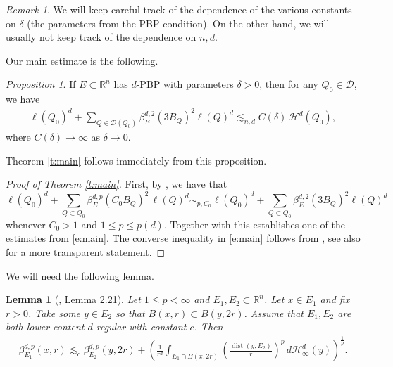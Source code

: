 \documentclass[11pt,reqno]{amsart}
\def\dist{\mathop\mathrm{dist}} 						%
\newtheorem{lemma}[theorem]{Lemma}
\theoremstyle{definition}
\theoremstyle{remark}
\newtheorem{remark}[theorem]{Remark}
\numberwithin{equation}{section}
\newcommand{\R}{\mathbb{R}}
\newcommand{\hd}{\mathcal{H}^d}
\newcommand{\hdc}{\mathcal{H}^d_\infty}
\newcommand{\dD}{\mathcal{D}}
\theoremstyle{theorem}
\newtheorem{propo}[theorem]{Proposition}
\theoremstyle{definition}
\theoremstyle{remark}
\numberwithin{equation}{section}
\begin{document}
 
	\begin{remark}
		We will keep careful track of the dependence of the various constants on $\delta$ (the parameters from the PBP condition). On the other hand, we will usually not keep track of the dependence on $n,d$.
	\end{remark}
	Our main estimate is the following.
	\begin{propo}\label{l:main-lemma}
		If $E \subset \R^n$ has $d$-PBP with parameters $\delta>0$, then for any $Q_0 \in \dD$, we have
		\begin{align}\label{eq:atst}
		\ell(Q_0)^d + \sum_{Q \in \dD(Q_0)} \beta_E^{d,2}(3B_Q)^2 \ell(Q)^d \lesssim_{n,d} C( \delta) \, \hd(Q_0),
		\end{align}
		where $C( \delta) \to \infty$ as $\delta\to 0$.
	\end{propo}
	Theorem \ref{t:main} follows immediately from this proposition.
	\begin{proof}[Proof of Theorem \ref{t:main}]
		First, by \cite[(A.3)]{azzam2019quantitative}, we have that 
		\begin{equation}\label{eq:WLOGp2}
		\ell(Q_0)^d+\sum_{Q \subset Q_0} \beta_E^{d,p}(C_0 B_Q)^2 \,\ell(Q)^d \sim_{p, C_0} \ell(Q_0)^d+ \sum_{Q \subset Q_0} \beta_E^{d,2}(3B_Q)^2 \ell(Q)^d
		\end{equation}
		whenever $C_0 >1$ and $1 \leq p \leq p(d)$. Together with  this establishes one of the estimates from \eqref{e:main}. The converse inequality in \eqref{e:main} follows from \cite[Theorem II]{azzam2018analyst}, see also \cite[Theorem A.1(1)]{azzam2019quantitative} for a more transparent statement. 
	\end{proof}

 We will need the following lemma.
	\begin{lemma}[{\cite{azzam2018analyst}, Lemma 2.21}] \label{lemma:azzamschul}
		Let $1 \leq p < \infty$ and $E_1, E_2 \subset \R^n$. Let $x \in E_1$ and fix $r>0$. Take some $y \in E_2$ so that $B(x,r) \subset B(y, 2r)$. Assume that $E_1, E_2$ are both lower content $d$-regular with constant $c$. Then
		\begin{align*}
		\beta_{E_1}^{d,p} (x,r) \lesssim_c \beta_{E_2}^{d,p} (y, 2r) + \left( \frac{1}{r^d} \int_{E_1 \cap B(x, 2r)} \left(\frac{\dist (y, E_2)}{r} \right)^p \, d \hdc(y)\right)^{\frac{1}{p}}.
		\end{align*}
	\end{lemma}
\end{document}

